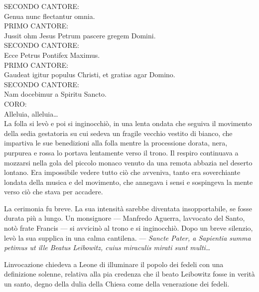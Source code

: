 SECONDO CANTORE:
\leavevmode\\

Genua nunc flectantur omnia.
\leavevmode\\

PRIMO CANTORE:
\leavevmode\\

Jussit ohm Jesus Petrum pascere gregem Domini.
\leavevmode\\

SECONDO CANTORE:
\leavevmode\\

Ecce Petrus Pontifex Maximus.
\leavevmode\\

PRIMO CANTORE:
\leavevmode\\

Gaudeat igitur populus Christi, et gratias agar Domino.
\leavevmode\\

SECONDO CANTORE:
\leavevmode\\

Nam docebimur a Spiritu Sancto.
\leavevmode\\

CORO:
\leavevmode\\

Alleluia, alleluia\ldots{}
\leavevmode\\

La folla si levò e poi si inginocchiò, in una lenta ondata che seguiva
il movimento della sedia gestatoria su cui sedeva un fragile vecchio
vestito di bianco, che impartiva le sue benedizioni alla folla mentre la
processione dorata, nera, purpurea e rossa lo portava lentamente verso
il trono. Il respiro continuava a mozzarsi nella gola del piccolo monaco
venuto da una remota abbazia nel deserto lontano. Era impossibile vedere
tutto ciò che avveniva, tanto era soverchiante l\textquotesingle ondata
della musica e del movimento, che annegava i sensi e sospingeva la mente
verso ciò che stava per accadere.

La cerimonia fu breve. La sua intensità sarebbe diventata
insopportabile, se fosse durata più a lungo. Un monsignore --- Manfredo
Aguerra, l\textquotesingle avvocato del Santo, notò frate Francis --- si
avvicinò al trono e si inginocchiò. Dopo un breve silenzio, levò la sua
supplica in una calma cantilena. --- \emph{Sancte Pater, a Sapientia
	summa petimus ut ille Beatus Leibowitz, cuius miraculis mirati sunt
	multi\ldots{}}

L\textquotesingle invocazione chiedeva a Leone di illuminare il popolo
dei fedeli con una definizione solenne, relativa alla pia credenza che
il beato Leibowitz fosse in verità un santo, degno della dulia della
Chiesa come della venerazione dei fedeli.

